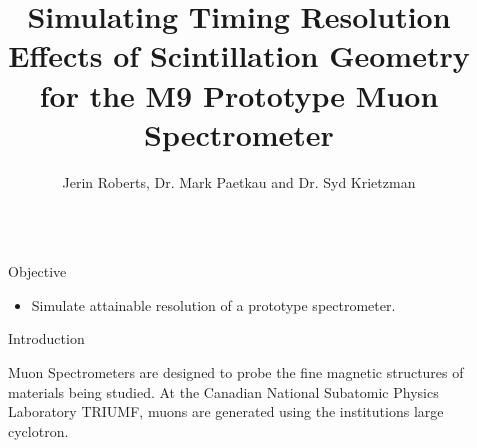 \documentclass[final]{beamer}
\title{Simulating Timing Resolution Effects of Scintillation Geometry for the M9 Prototype
Muon Spectrometer} %
\author{Jerin Roberts, Dr. Mark Paetkau and Dr. Syd Krietzman} %
\institute{Physical Sciences  Thompson Rivers University} %
\newlength{\sepwid}
\newlength{\onecolwid}
\begin{document}

\setlength{\belowcaptionskip}{1ex} %
\setlength\belowdisplayshortskip{1ex} %

\begin{frame}[t] %

\begin{columns}[t] %

\begin{column}{\sepwid}\end{column} %

\begin{column}{\onecolwid} %




\begin{alertblock}{Objective}

\begin{itemize}
\item Simulate attainable resolution of a prototype spectrometer.
\end{itemize}

\end{alertblock}

\begin{block}{Introduction}

Muon Spectrometers are designed to probe the fine magnetic structures of materials being studied. At the Canadian National Subatomic Physics Laboratory TRIUMF, muons are generated using the institutions large cyclotron. 


\end{block}
\end{column}
\end{columns}
\end{frame}
\end{document}
